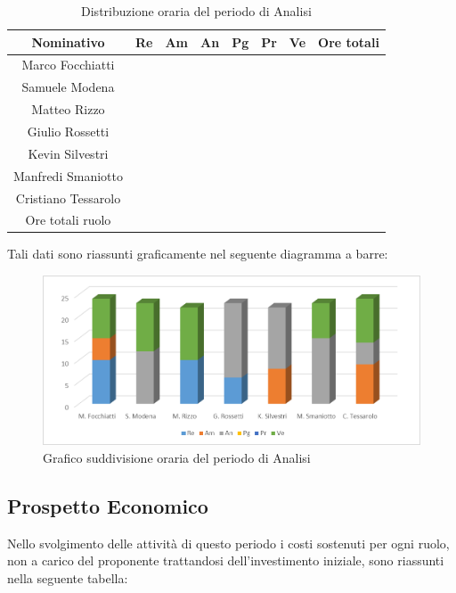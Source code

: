 \documentclass[./PianodiProgetto.tex]{subfiles}
\begin{document}
\begin{table}[H]
	\centering
	\begin{tabular}{|c|cccccc|c|}
		\hline
		Nominativo&Re&Am&An&Pg&Pr&Ve&Ore totali\\ \hline
		Marco Focchiatti& & & & & & & \\ \hline
		Samuele Modena& & & & & & & \\ \hline
		Matteo Rizzo& & & & & & & \\ \hline
		Giulio Rossetti& & & & & & & \\ \hline
		Kevin Silvestri& & & & & & & \\ \hline
		Manfredi Smaniotto& & & & & & & \\ \hline
		Cristiano Tessarolo& & & & & & & \\  \hline
		Ore totali ruolo& & & & & & & \\ \hline
	\end{tabular}
\caption{Distribuzione oraria del periodo di Analisi}
\end{table}

Tali dati sono riassunti graficamente nel seguente diagramma a barre:
\begin{figure}[H]
	\centering
	\includegraphics[width=1\linewidth]{img/grafici/AnalisiProspettoOrario}
	\caption{Grafico suddivisione oraria del periodo di Analisi}
	\label{fig:analisi-prospetto-orario}
\end{figure}

\subsection{Prospetto Economico}
Nello svolgimento delle attività di questo periodo i costi sostenuti per ogni ruolo, non a carico del proponente trattandosi dell’investimento iniziale, sono riassunti nella seguente tabella:
\end{document}
